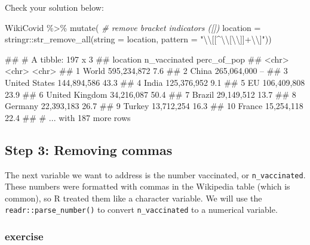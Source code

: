 \documentclass[11pt,]{article}
\newenvironment{Shaded}{\begin{snugshade}}{\end{snugshade}}
\newcommand{\AttributeTok}[1]{\textcolor[rgb]{0.77,0.63,0.00}{#1}}
\newcommand{\CommentTok}[1]{\textcolor[rgb]{0.56,0.35,0.01}{\textit{#1}}}
\newcommand{\FunctionTok}[1]{\textcolor[rgb]{0.00,0.00,0.00}{#1}}
\newcommand{\NormalTok}[1]{#1}
\newcommand{\SpecialCharTok}[1]{\textcolor[rgb]{0.00,0.00,0.00}{#1}}
\newcommand{\StringTok}[1]{\textcolor[rgb]{0.31,0.60,0.02}{#1}}
\let\oldShaded\Shaded
\let\endoldShaded\endShaded
\renewenvironment{Shaded}{\footnotesize\oldShaded}{\endoldShaded}
\let\oldverbatim\verbatim
\let\endoldverbatim\endverbatim
\renewenvironment{verbatim}{\footnotesize\oldverbatim}{\endoldverbatim}
\begin{document}
Check your solution below:

\begin{Shaded}
\begin{Highlighting}[]
\NormalTok{WikiCovid }\SpecialCharTok{\%\textgreater{}\%}
  \FunctionTok{mutate}\NormalTok{(}
    \CommentTok{\# remove bracket indicators ([])}
    \AttributeTok{location =}\NormalTok{ stringr}\SpecialCharTok{::}\FunctionTok{str\_remove\_all}\NormalTok{(}\AttributeTok{string =}\NormalTok{ location, }
                                       \AttributeTok{pattern =} \StringTok{"}\SpecialCharTok{\textbackslash{}\textbackslash{}}\StringTok{[[\^{}}\SpecialCharTok{\textbackslash{}\textbackslash{}}\StringTok{[}\SpecialCharTok{\textbackslash{}\textbackslash{}}\StringTok{]]+}\SpecialCharTok{\textbackslash{}\textbackslash{}}\StringTok{]"}\NormalTok{))}
\end{Highlighting}
\end{Shaded}

\begin{verbatim}
## # A tibble: 197 x 3
##    location       n_vaccinated perc_of_pop
##    <chr>          <chr>        <chr>      
##  1 World          595,234,872  7.6%       
##  2 China          265,064,000  --         
##  3 United States  144,894,586  43.3%      
##  4 India          125,376,952  9.1%       
##  5 EU             106,409,808  23.9%      
##  6 United Kingdom 34,216,087   50.4%      
##  7 Brazil         29,149,512   13.7%      
##  8 Germany        22,393,183   26.7%      
##  9 Turkey         13,712,254   16.3%      
## 10 France         15,254,118   22.4%      
## # ... with 187 more rows
\end{verbatim}

\hypertarget{step-3-removing-commas}{%
\subsection{Step 3: Removing commas}\label{step-3-removing-commas}}

The next variable we want to address is the number vaccinated, or
\texttt{n\_vaccinated}. These numbers were formatted with commas in the
Wikipedia table (which is common), so R treated them like a character
variable. We will use the \texttt{readr::parse\_number()} to convert
\texttt{n\_vaccinated} to a numerical variable.

\hypertarget{exercise-4}{%
\subsubsection{exercise}\label{exercise-4}}
\end{document}
